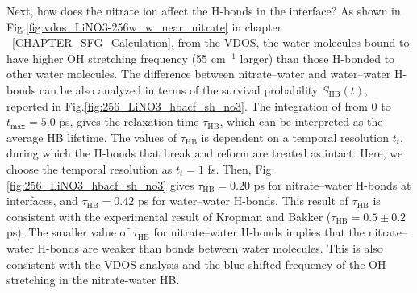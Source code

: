 Next, how does the nitrate ion affect the H-bonds in the interface?
As shown in Fig.\space\ref{fig:vdos_LiNO3-256w_w_near_nitrate} in chapter ~\ref{CHAPTER_SFG_Calculation}, 
from the VDOS, the water molecules bound to \nitrate have higher OH stretching frequency (55 cm$^{-1}$ larger) 
than those H-bonded to other water molecules. 
%
The difference between nitrate--water and water--water H-bonds 
can be also analyzed in terms of the survival probability $S_{\text{HB}}(t)$, \cite{AKS86,JT90,AL96} 
reported in Fig.\thinspace\ref {fig:256_LiNO3_hbacf_sh_no3}.
The integration of \SHB from 0 to $t_{\max}=5.0$ ps, \cite{Steinel2004} gives the relaxation time $\tau_\text{HB}$, which can be interpreted as 
the average HB lifetime. \cite{SC02} 
The values of $\tau_{\text{HB}}$ is dependent on a temporal resolution $t_t$, during which the H-bonds that break and reform are treated as intact. \cite{AL00} 
%
Here, we choose the temporal resolution as $t_t=1$ fs. 
Then, Fig.\thinspace\ref {fig:256_LiNO3_hbacf_sh_no3} gives $\tau_\text{HB}=0.20$ ps for nitrate--water H-bonds at interfaces, and $\tau_\text{HB}=0.42$ ps for water--water H-bonds.
This result of $\tau_\text{HB}$ is consistent with the experimental result of Kropman and Bakker ($\tau_\text{HB}=0.5\pm0.2$ ps). \cite{MFK01}
The smaller value of $\tau_\text{HB}$ for nitrate--water H-bonds implies that the nitrate--water H-bonds are weaker than bonds between water molecules. 
This is also consistent with the VDOS analysis and the blue-shifted frequency of the OH stretching in the nitrate-water HB. 

